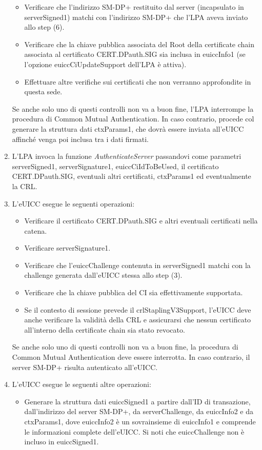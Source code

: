 \documentclass[10pt, oneside]{book}
\begin{document}
\begin{enumerate}
\begin{itemize}[itemsep=0pt]
\item Verificare che l'indirizzo SM-DP+ restituito dal server (incapsulato in serverSigned1) matchi con l'indirizzo SM-DP+ che l'LPA aveva inviato allo step (6).
\item Verificare che la chiave pubblica associata del Root della certificate chain associata al certificato CERT.DPauth.SIG sia inclusa in euiccInfo1 (se l'opzione euiccCiUpdateSupport dell'LPA è attiva).
\item Effettuare altre verifiche sui certificati che non verranno approfondite in questa sede.
\end{itemize}
Se anche solo uno di questi controlli non va a buon fine, l'LPA interrompe la procedura di Common Mutual Authentication. In caso contrario, procede col generare la struttura dati ctxParams1, che dovrà essere inviata all'eUICC affinché venga poi inclusa tra i dati firmati.
\item L'LPA invoca la funzione \textit{AuthenticateServer} passandovi come parametri serverSigned1, serverSignature1, euiccCiIdToBeUsed, il certificato CERT.DPauth.SIG, eventuali altri certificati, ctxParams1 ed eventualmente la CRL.
\item L'eUICC esegue le seguenti operazioni:
\begin{itemize}[itemsep=0pt]
\item Verificare il certificato CERT.DPauth.SIG e altri eventuali certificati nella catena.
\item Verificare serverSignature1.
\item Verificare che l'euiccChallenge contenuta in serverSigned1 matchi con la challenge generata dall'eUICC stessa allo step (3).
\item Verificare che la chiave pubblica del CI sia effettivamente supportata.
\item Se il contesto di sessione prevede il crlStaplingV3Support, l'eUICC deve anche verificare la validità della CRL e assicurarsi che nessun certificato all'interno della certificate chain sia stato revocato.
\end{itemize}
Se anche solo uno di questi controlli non va a buon fine, la procedura di Common Mutual Authentication deve essere interrotta. In caso contrario, il server SM-DP+ risulta autenticato all'eUICC.
\item L'eUICC esegue le seguenti altre operazioni:
\begin{itemize}[itemsep=0pt]
\item Generare la struttura dati euiccSigned1 a partire dall'ID di transazione, dall'indirizzo del server SM-DP+, da serverChallenge, da euiccInfo2 e da ctxParams1, dove euiccInfo2 è un sovrainsieme di euiccInfo1 e comprende le informazioni complete dell'eUICC. Si noti che euiccChallenge non è incluso in euiccSigned1.

\end{itemize}
\end{enumerate}
\end{document}
